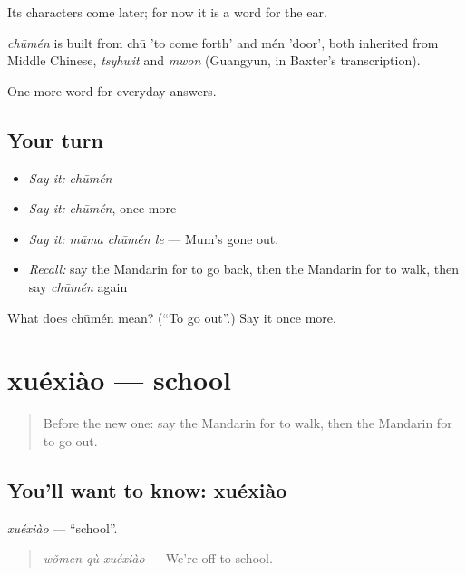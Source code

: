 Its characters come later; for now it is a word for the ear.

\begin{cousinweb}
\emph{chūmén} is built from chū 'to come forth' and mén 'door', both inherited from Middle Chinese, \emph{tsyhwit} and \emph{mwon} (Guangyun, in Baxter's transcription).
\end{cousinweb}

\begin{grammarlens}[title={What you've built}]
One more word for everyday answers.
\end{grammarlens}

\subsection*{Your turn}
\begin{itemize}
\raggedright
  \item \emph{Say it:} \emph{chūmén}
  \item \emph{Say it:} \emph{chūmén}, once more
  \item \emph{Say it:} \emph{māma chūmén le} — Mum's gone out.
  \item \emph{Recall:} say the Mandarin for to go back, then the Mandarin for to walk, then say \emph{chūmén} again
\end{itemize}

\begin{tcolorbox}[breakable,colback=teal!4,colframe=teal!35!black,title={Before you move on}]
What does chūmén mean? (\textquotedblleft{}To go out\textquotedblright{}.) Say it once more.
\end{tcolorbox}
\section[xuéxiào]{xuéxiào — school}

\label{lesson:ZH-C43-xuexiao}



\begin{quote}
Before the new one: say the Mandarin for to walk, then the Mandarin for to go out.
\end{quote}

\subsection*{You'll want to know: xuéxiào}
\emph{xuéxiào} — \textquotedblleft{}school\textquotedblright{}.

\begin{quote}
\emph{wǒmen qù xuéxiào} — We're off to school.
\end{quote}

